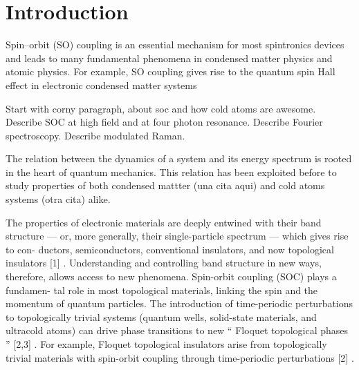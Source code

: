 \section{Introduction}




Spin–orbit (SO) coupling is an essential mechanism for most
spintronics devices and leads to many fundamental phenomena
in condensed matter physics and atomic physics. For example,
SO coupling gives rise to the quantum spin Hall effect in
electronic condensed matter systems

Start with corny paragraph, about soc and how cold atoms are awesome.
Describe SOC at high field and at four photon resonance. Describe Fourier spectroscopy. Describe modulated Raman. 

The relation between the dynamics of a system and its energy spectrum is rooted in the heart of quantum mechanics.  This relation has been exploited before to study properties of both condensed mattter (una cita aqui) and cold atoms systems (otra cita) alike.



The  properties  of  electronic  materials  are  deeply
entwined with their band structure
—
or, more generally,
their single-particle spectrum
—
which gives rise to con-
ductors, semiconductors, conventional insulators, and now
topological insulators
[1]
. Understanding and controlling
band structure in new ways, therefore, allows access to new
phenomena. Spin-orbit coupling (SOC) plays a fundamen-
tal role in most topological materials, linking the spin and
the momentum of quantum particles. The introduction of
time-periodic perturbations to topologically trivial systems
(quantum wells, solid-state materials, and ultracold atoms)
can drive phase transitions to new
“
Floquet topological
phases
”
[2,3]
. For example, Floquet topological insulators
arise from topologically trivial materials with spin-orbit
coupling through time-periodic perturbations
[2]
.


